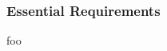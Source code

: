 
\subsubsection{Essential Requirements}
\label{sec:eval_llvm_ir_library_essential_requirements}

foo

